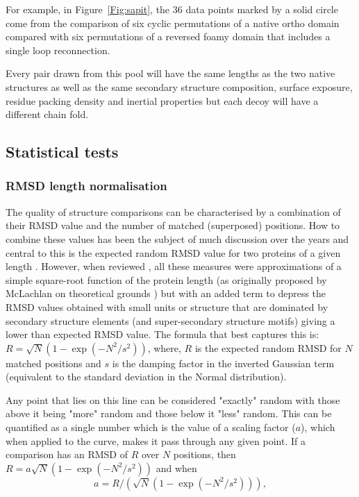 \documentclass{bmcart}
\newcommand{\Fig}[1]{Figure~\ref{Fig:#1}}
\begin{document}
For example, in \Fig{sapit}, the 36 data
points marked by a solid circle come from the comparison of six cyclic permutations of a
native ortho domain compared with six permutations of a reversed foamy domain that includes
a single loop reconnection.

Every pair drawn from this pool will have the same lengths as the two native structures
as well as the same secondary structure composition, surface exposure, residue packing
density and inertial properties but each decoy will have a different chain fold.


\subsection*{Statistical tests}

\subsubsection*{RMSD length normalisation}

The quality of structure comparisons can be characterised by a combination of their
RMSD value and the number of matched (superposed) positions.  How to combine these values has
been the subject of much discussion over the years and central to this is the expected random
RMSD value for two proteins of a given length \cite{McLachlanAD84,CohenFEet80d,MaiorovVNet94}.   However,
when reviewed \cite{TaylorWR06a}, all these measures were approximations of a simple square-root function of
the protein length (as originally proposed by McLachlan on theoretical grounds \cite{McLachlanAD84})
but with an added term to depress the RMSD values obtained with small units or structure
that are dominated by secondary structure elements (and super-secondary structure motifs)
giving a lower than expected RMSD value.   The formula that best captures this is:
$R = \surd N (1-\exp(-N^2/s^2))$,
where,
$R$ is the expected random RMSD for $N$ matched positions and $s$ is the damping factor in the inverted
Gaussian term (equivalent to the standard deviation in the Normal distribution).

Any point that lies on this line can be considered "exactly" random
with those above it being "more" random and those below it "less" random.  This can be quantified
as a single number which is the value of a scaling factor ($a$), which when applied to the curve, makes it
pass through any given point.   If a comparison has an RMSD of $R$ over $N$ positions, then
$R = a\surd N (1-\exp(-N^2/s^2))$ and when
\begin{equation}
\label{Eqn:fit}
a = R/(\surd N (1-\exp(-N^2/s^2))), 
\end{equation}
\end{document}
